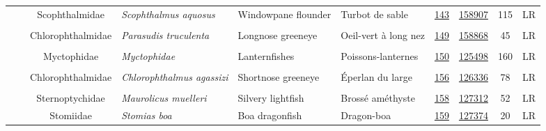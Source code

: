 \documentclass[12pt]{article}\usepackage[]{graphicx}\usepackage[]{color}
\begin{document}
\begin{landscapepage}
\begin{longtable}[t]{ccc>{\centering\arraybackslash}p{3cm}>{\centering\arraybackslash}p{3cm}>{\centering\arraybackslash}p{3cm}>{}c>{}ccc}
\nopagebreak
\hspace{1em}\hspace{1em} &  & Scophthalmidae & \em{Scophthalmus aquosus} & Windowpane flounder & Turbot de sable & \href{#sec:143}{143} & \href{http://www.marinespecies.org/aphia.php?p=taxdetails&id=158907}{158907} & 115 & LR\\
\nopagebreak
\addlinespace[0.3em]
\\
\hspace{1em}\hspace{1em} &  & Chlorophthalmidae & \em{Parasudis truculenta} & Longnose greeneye & Oeil-vert à long nez & \href{#sec:149}{149} & \href{http://www.marinespecies.org/aphia.php?p=taxdetails&id=158868}{158868} & 45 & LR\\
\nopagebreak
\addlinespace[0.3em]
\\
\hspace{1em}\hspace{1em} &  & Myctophidae & \em{Myctophidae} & Lanternfishes & Poissons-lanternes & \href{#sec:150}{150} & \href{http://www.marinespecies.org/aphia.php?p=taxdetails&id=125498}{125498} & 160 & LR\\
\nopagebreak
\addlinespace[0.3em]
\\
\hspace{1em}\hspace{1em} &  & Chlorophthalmidae & \em{Chlorophthalmus agassizi} & Shortnose greeneye & Éperlan du large & \href{#sec:156}{156} & \href{http://www.marinespecies.org/aphia.php?p=taxdetails&id=126336}{126336} & 78 & LR\\
\nopagebreak
\addlinespace[0.3em]
\\
\hspace{1em}\hspace{1em} &  & Sternoptychidae & \em{Maurolicus muelleri} & Silvery lightfish & Brossé améthyste & \href{#sec:158}{158} & \href{http://www.marinespecies.org/aphia.php?p=taxdetails&id=127312}{127312} & 52 & LR\\
\nopagebreak
\hspace{1em}\hspace{1em} &  & Stomiidae & \em{Stomias boa} & Boa dragonfish & Dragon-boa & \href{#sec:159}{159} & \href{http://www.marinespecies.org/aphia.php?p=taxdetails&id=127374}{127374} & 20 & LR\\

\end{longtable}
\end{landscapepage}
\end{document}
